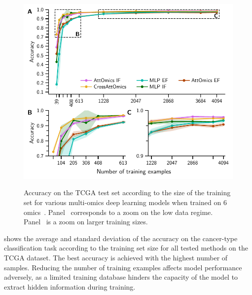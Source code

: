 \documentclass[../main.tex]{subfiles}
\begin{document}
		\begin{figure}[htbp]
			\centering
			\begin{subcaptiongroup}
				\includegraphics{limited_training_6_omics.pdf}
				\label{fig:lim_train_6_omics_A}
				\label{fig:lim_train_6_omics_B}
				\label{fig:lim_train_6_omics_C}
			\end{subcaptiongroup}
			\caption[CrossAttOmics and other architectures accuracy on the TCGA test set according to the size of the training set]{Accuracy on the TCGA test set according to the size of the training set for various multi-omics deep learning models when trained on 6 omics~. Panel~ corresponds to a zoom on the low data regime. Panel~ is a zoom on larger training sizes.}\label{fig:lim_train_6_omics}
		\end{figure}

		 shows the average and standard deviation of the accuracy on the cancer-type classification task according to the training set size for all tested methods on the TCGA dataset.
		The best accuracy is achieved with the highest number of samples.
		Reducing the number of training examples affects model performance adversely, as a limited training database hinders the capacity of the model to extract hidden information during training.
\end{document}
